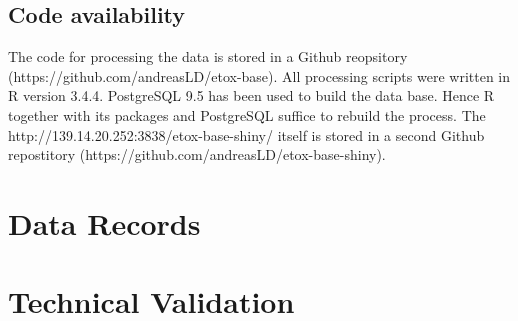 \documentclass[english]{article}
\newcommand{\app}{http://139.14.20.252:3838/etox-base-shiny/}
\newcommand{\git}{https://github.com/andreasLD/etox-base}
\newcommand{\gitapp}{https://github.com/andreasLD/etox-base-shiny}
\begin{document}
\subsection*{Code availability}

The code for processing the data is stored in a Github reopsitory (\git{}). All processing scripts were written in R version 3.4.4. PostgreSQL 9.5 has been used to build the data base. Hence R together with its packages and PostgreSQL suffice to rebuild the process. The \app{} itself is stored in a second Github repostitory (\gitapp{}).

\section*{Data Records}



\section*{Technical Validation}
\end{document}
